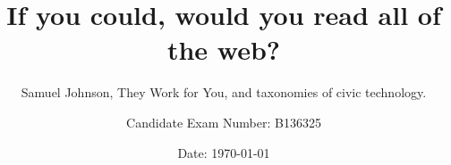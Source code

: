 \title{If you could, would you read all of the web?}
\subtitle{Samuel Johnson, They Work for You, and taxonomies of civic technology.}

\author{Candidate Exam Number: B136325}


\date{Date: \today}